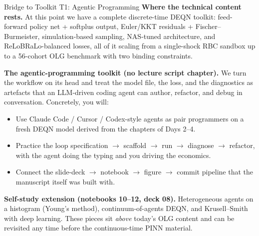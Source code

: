 \documentclass[aspectratio=169,11pt]{beamer}
\newcommand{\emphc}[1]{\textcolor{harvardcrimson}{#1}}
\begin{document}
\begin{frame}{Bridge to Toolkit T1: Agentic Programming}
\footnotesize
\textbf{Where the technical content rests.}  At this point we have a complete discrete-time DEQN toolkit: feed-forward policy net + softplus output, Euler/KKT residuals + Fischer--Burmeister, simulation-based sampling, NAS-tuned architecture, and ReLoBRaLo-balanced losses, all of it scaling from a single-shock RBC sandbox up to a 56-cohort OLG benchmark with two binding constraints.

\vspace{0.4em}
\textbf{The agentic-programming toolkit (no lecture script chapter).}  We turn the workflow on its head and treat the model file, the loss, and the diagnostics as artefacts that an LLM-driven coding agent can author, refactor, and debug in conversation.  Concretely, you will:
\begin{itemize}\itemsep1pt
    \item Use Claude Code / Cursor / Codex-style agents as pair programmers on a fresh DEQN model derived from the chapters of Days 2--4.
    \item Practice the loop \emphc{specification $\to$ scaffold $\to$ run $\to$ diagnose $\to$ refactor}, with the agent doing the typing and you driving the economics.
    \item Connect the slide-deck $\to$ notebook $\to$ figure $\to$ commit pipeline that the manuscript itself was built with.
\end{itemize}

\vspace{0.4em}
\textbf{Self-study extension (notebooks 10--12, deck 08).}  Heterogeneous agents on a histogram (Young's method), continuum-of-agents DEQN, and Krusell--Smith with deep learning.  These pieces sit \emph{above} today's OLG content and can be revisited any time before the continuous-time PINN material.
\end{frame}
\end{document}
